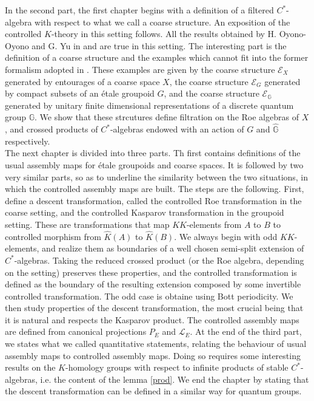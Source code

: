 In the second part, the first chapter begins with a definition of a filtered $C^*$-algebra with respect to what we call a coarse structure. An exposition of the controlled $K$-theory in this setting follows. All the results obtained by H. Oyono-Oyono and G. Yu in \cite{OY2} and \cite{OY3} are true in this setting. The interesting part is the definition of a coarse structure and the examples which cannot fit into the former formalism adopted in \cite{OY2}. These examples are given by the coarse structure $\mathcal E_X$ generated by entourages of a coarse space $X$, the coarse structure $\mathcal E_G$ generated by compact subsets of an étale groupoid $G$, and the coarse structure $\mathcal E_{\mathbb G}$ generated by unitary finite dimensional representations of a discrete quantum group $\mathbb G$. We show that these strcutures define filtration on the Roe algebras of $X$, and crossed products of $C^*$-algebras endowed with an action of $G$ and $\hat{\mathbb G}$ respectively.\\

The next chapter is divided into three parts. Th first contains definitions of the usual assembly maps for étale groupoids and coarse spaces. It is followed by two very similar parts, so as to underline the similarity between the two situations, in which the controlled assembly maps are built. The steps are the following. First, define a descent transformation, called the controlled Roe transformation in the coarse setting, and the controlled Kasparov transformation in the groupoid setting. These are transformations that map $KK$-elements from $A$ to $B$ to controlled morphism from $\hat K(A)$ to $\hat K(B)$. We always begin with odd $KK$-elements, and realize them as boundaries of a well chosen semi-split extension of $C^*$-algebras. Taking the reduced crossed product (or the Roe algebra, depending on the setting) preserves these properties, and the controlled transformation is defined as the boundary of the resulting extension composed by some invertible controlled transformation. The odd case is obtaine using Bott periodicity. We then study properties of the descent transformation, the most crucial being that it is natural and respects the Kasparov product. The controlled assembly maps are defined from canonical projections $P_E$ and $\mathcal L_E$. At the end of the third part, we states what we called quantitative statements, relating the behaviour of usual assembly maps to controlled assembly maps. Doing so requires some interesting results on the $K$-homology groups with respect to infinite products of stable $C^*$-algebras, i.e. the content of the lemma \ref{prod}. We end the chapter by stating that the descent transformation can be defined in a similar way for quantum groups.\\

